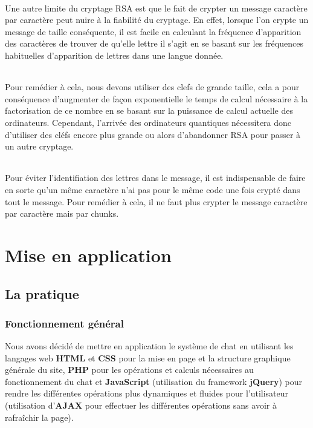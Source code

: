 \documentclass[12pt,a4paper]{report}
\begin{document}
\paragraph{}
Une autre limite du cryptage RSA est que le fait de crypter un message caractère par caractère peut nuire à la fiabilité du cryptage. En effet, lorsque l'on crypte un message de taille conséquente, il est facile en calculant la fréquence d'apparition des caractères de trouver de qu'elle lettre il s'agit en se basant sur les fréquences habituelles d'apparition de lettres dans une langue donnée.

\paragraph{}
Pour remédier à cela, nous devons utiliser des clefs de grande taille, cela a pour conséquence d'augmenter de façon exponentielle le temps de calcul nécessaire à la factorisation de ce nombre en se basant sur la puissance de calcul actuelle des ordinateurs. Cependant, l'arrivée des ordinateurs quantiques nécessitera donc d'utiliser des cléfs encore plus grande ou alors d'abandonner RSA pour passer à un autre cryptage. 

\paragraph{}
Pour éviter l'identifiation des lettres dans le message, il est indispensable de faire en sorte qu'un même caractère n'ai pas pour le même code une fois crypté dans tout le message. Pour remédier à cela, il ne faut plus crypter le message caractère par caractère mais par chunks.

\part{Mise en application}
\chapter{La pratique}
\section{Fonctionnement général}



Nous avons décidé de mettre en application le système de chat en utilisant les langages web \textbf{HTML} et \textbf{CSS} pour la mise en page et la structure graphique générale du site, \textbf{PHP} pour les opérations et calculs nécessaires au fonctionnement du chat et \textbf{JavaScript} (utilisation du framework \textbf{jQuery}) pour rendre les différentes opérations plus dynamiques et fluides pour l'utilisateur (utilisation d'\textbf{AJAX} pour effectuer les différentes opérations sans avoir à rafraîchir la page).
\end{document}
